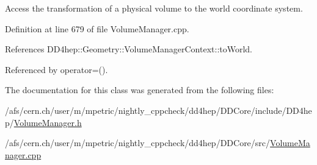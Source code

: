 Access the transformation of a physical volume to the world coordinate system. 



Definition at line 679 of file Volume\+Manager.\+cpp.



References D\+D4hep\+::\+Geometry\+::\+Volume\+Manager\+Context\+::to\+World.



Referenced by operator=().



The documentation for this class was generated from the following files\+:\begin{DoxyCompactItemize}
\item 
/afs/cern.\+ch/user/m/mpetric/nightly\+\_\+cppcheck/dd4hep/\+D\+D\+Core/include/\+D\+D4hep/\hyperlink{_volume_manager_8h}{Volume\+Manager.\+h}\item 
/afs/cern.\+ch/user/m/mpetric/nightly\+\_\+cppcheck/dd4hep/\+D\+D\+Core/src/\hyperlink{_volume_manager_8cpp}{Volume\+Manager.\+cpp}\end{DoxyCompactItemize}
